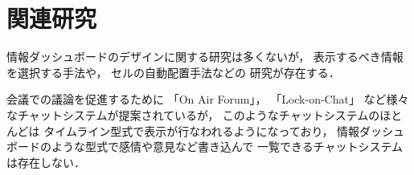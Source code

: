 \section{関連研究}

情報ダッシュボードのデザイン\cite{few}に関する研究は多くないが，
表示するべき情報を選択する手法\cite{Jones:2015:ECI:2800835.2800963}や，
セルの自動配置手法\cite{Hertzog:2015:BSP:2678025.2701383}などの
研究が存在する．

会議での議論を促進するために
「On Air Forum」\cite{nishida2011}，
「Lock-on-Chat」\cite{nishida2006}
など様々なチャットシステムが提案されているが，
このようなチャットシステムのほとんどは
タイムライン型式で表示が行なわれるようになっており，
情報ダッシュボードのような型式で感情や意見など書き込んで
一覧できるチャットシステムは存在しない．